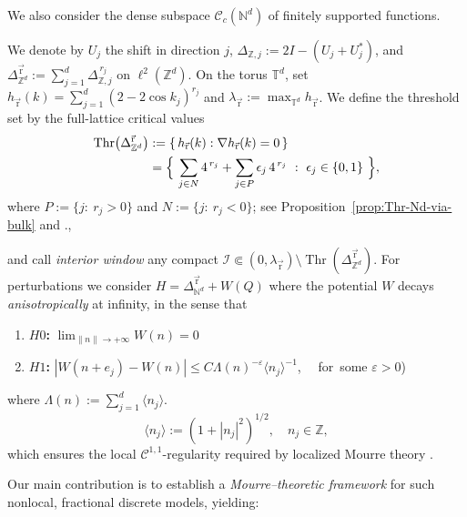 \documentclass[10pt]{amsart}
\newcommand{\N}{{\mathbb{N}}}
\newcommand{\1}{{\mathbb{I}}}
\newcommand{\Ic}{\mathcal{I}}
\newcommand{\Thr}{\operatorname{Thr}}
\numberwithin{equation}{section}
\begin{document}
We also consider the dense subspace \(\mathcal{C}_c(\N^d)\) of finitely supported functions.


We denote by $U_j$  the shift in direction $j$, $\Delta_{\mathbb{Z},j}:=2I-(U_j+U_j^*)$, and $\Delta_{\mathbb{Z}^d}^{\vec{\mathrm r}}:=\sum_{j=1}^d \Delta_{\mathbb{Z},j}^{\,r_j}$ on $\ell^2(\mathbb{Z}^d)$.
On the torus $\mathbb{T}^d$, set $h_{\vec{\mathrm r}}(k)=\sum_{j=1}^d (2-2\cos k_j)^{r_j}$ and $\lambda_{\vec{\mathrm r}}:=\max_{\mathbb{T}^d} h_{\vec{\mathrm r}}$.
We define the threshold set by the full-lattice critical values
\[\begin{split}
\Thr\!\big(\Delta_{\mathbb{Z}^d}^{\vec{\mathrm r}}\big)&:=\{\, h_{\vec{\mathrm r}}(k): \nabla h_{\vec{\mathrm r}}(k)=0\,\}\\&=\Bigl\{\ \sum_{j\in N}4^{\,r_j}+\sum_{j\in P}\epsilon_j\,4^{\,r_j}\ :\ \epsilon_j\in\{0,1\}\ \Bigr\},
\end{split}\]
where $P:=\{j:\ r_j>0\}$ and $N:=\{j:\ r_j<0\}$; see Proposition~\ref{prop:Thr-Nd-via-bulk} and \cite[Proposition 2.12]{At}.,

and call \emph{interior window} any compact $\Ic\Subset (0,\lambda_{\vec{\mathrm r}})\setminus \Thr(\Delta_{\mathbb{Z}^d}^{\vec{\mathrm r}})$.
For perturbations we consider $H=\Delta_{\mathbb{N}^d}^{\vec{\mathrm r}}+W(Q)$ where the potential $W$ decays \emph{anisotropically} at infinity,
in the sense that
\begin{enumerate}
\item \textbf{$H0$:} $\lim_{\|n\|\rightarrow+\infty}W(n)=0$
\item \textbf{$H1$:}
$|W(n + e_j) - W(n)| \leq C \Lambda(n)^{-\varepsilon} \langle n_j \rangle^{-1}$,   \, \hbox{ for  some} $\varepsilon>0$)
\end{enumerate}
 where $\Lambda(n) := \sum_{j=1}^d \langle n_j \rangle.$
\[
\langle n_j \rangle := (1 + |n_j|^2)^{1/2}, \quad n_j \in \mathbb{Z},
\]  which ensures the local $\mathcal{C}^{1,1}$-regularity required by localized Mourre theory \cite[Thms.~7.4.1-7.4.2]{ABG}.


Our main contribution is to establish a \emph{Mourre--theoretic framework}
for such nonlocal, fractional discrete models, yielding:
\end{document}
